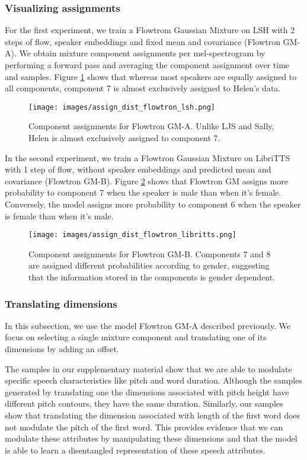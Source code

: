 \documentclass{article}
\begin{document}
\subsubsection{Visualizing assignments}
For the first experiment, we train a Flowtrom Gaussian Mixture on LSH with 2 steps of flow, speaker embeddings and fixed mean and covariance (Flowtron GM-A). We obtain mixture component assignments per mel-spectrogram by performing a forward pass and averaging the component assignment over time and samples. Figure \ref{fig:assignments_a} shows that whereas most speakers are equally assigned to all components, component 7 is almost exclusively assigned to Helen's data. 
\begin{figure}[!ht]
    \centering
    \texttt{[image: images/assign\_dist\_flowtron\_lsh.png]}
    \caption{Component assignments for Flowtron GM-A. Unlike LJS and Sally, Helen is almost exclusively assigned to component 7.}
    \label{fig:assignments_a}
\end{figure}

In the second experiment, we train a Flowtron Gaussian Mixture on LibriTTS with 1 step of flow, without speaker embeddings and predicted mean and covariance (Flowtron GM-B). Figure \ref{fig:assignments_b} shows that Flowtron GM assigns more probability to component 7 when the speaker is male than when it's female. Conversely, the model assigns more probability to component 6 when the speaker is female than when it's male.

\begin{figure}
\centering
        \texttt{[image: images/assign\_dist\_flowtron\_libritts.png]}
        \caption{Component assignments for Flowtron GM-B. Components 7 and 8 are assigned different probabilities according to gender, suggesting that the information stored in the components is gender dependent.}
        \label{fig:assignments_b}
\end{figure}

\subsubsection{Translating dimensions}
In this subsection, we use the model Flowtron GM-A described previously. We focus on selecting a single mixture component and translating one of its dimensions by adding an offset. 

The samples in our supplementary material show that we are able to modulate specific speech characteristics like pitch and word duration. Although the samples generated by translating one the dimensions associated with pitch height have different pitch contours, they have the same duration.  Similarly, our samples show that translating the dimension associated with length of the first word does not modulate the pitch of the first word. This provides evidence that we can modulate these attributes by manipulating these dimensions and that the model is able to learn a disentangled representation of these speech attributes.
\end{document}
